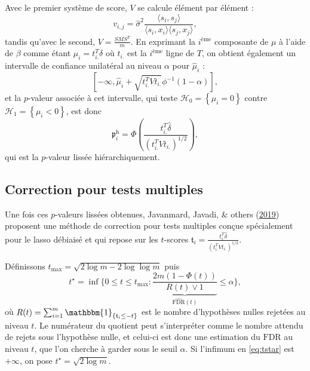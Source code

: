 \documentclass[12pt,a4paper]{reedthesis}
\newcommand \indic {\mathbbm{1}}
\newcommand \pv {\mathfrak{p}}
\newcommand \ts {\mathfrak{t}}
\newcommand \shifts {\delta}
\newcommand \optim {\beta}
\theoremstyle{definition}
\theoremstyle{definition}
\theoremstyle{definition}
\theoremstyle{remark}
\begin{document}
Avec le premier système de score, \(V\) se calcule élément par élément :
\begin{equation*}
v_{i,j} = \hat{\sigma}^2 \frac{\langle s_i,s_j\rangle}{\langle s_i,x_i\rangle\langle s_j,x_j\rangle},
\end{equation*}
tandis qu'avec le second, \(V = \frac{S M S^T }{m}\). En exprimant la \(i^{\text{ème}}\) composante de \(\mu\) à l'aide de \(\optim\) comme étant \(\mu_i = t_{i.}^T\shifts\) où \(t_{i.}\) est la \(i^{\text{ème}}\) ligne de \(T\), on obtient également un intervalle de confiance unilatéral au niveau \(\alpha\) pour \(\hat{\mu}_i\) :
\begin{equation*}
\left[-\infty, \hat{\mu}_i + \sqrt{t_{i.}^T V t_{i.}} \phi^{-1}\left(1-\alpha\right)\right],
\end{equation*}
et la \(p\)-valeur associée à cet intervalle, qui teste \(\mathcal{H}_0 = \left\{\mu_i = 0\right\}\) contre \(\mathcal{H}_1 = \left\{\mu_i < 0\right\}\), est donc
\begin{equation*}
\pv^\text{h}_i = \Phi\left(\frac{t_{i.}^T\hat{\shifts}}{\left(t_{i.}^TVt_{i.}\right)^{1/2}}\right),
\end{equation*}
qui est la \(p\)-valeur lissée hiérarchiquement.

\hypertarget{correction-pour-tests-multiples}{%
\subsection{Correction pour tests multiples}\label{correction-pour-tests-multiples}}

Une fois ces \(p\)-valeurs lissées obtenues, Javanmard, Javadi, \& others (\protect\hyperlink{ref-javanmard2019false}{2019}) proposent une méthode de correction pour tests multiples conçue spécialement pour le lasso débiaisé et qui repose sur les \(t\)-scores
\(\ts_i = \frac{t_{i.}^T\hat{\shifts}}{\left(t_{i.}^TVt_{i.}\right)^{1/2}}\).

Définissons \(t_{\text{max}} = \sqrt{2 \log m - 2 \log \log m}\) puis
\begin{equation}
\label{eq:tstar}
t^{\star} = \inf \bigg\{ 0 \leq t \leq t_{\max} : \underbrace{\frac{2 m(1 - \Phi(t))}{R(t) \vee 1}}_{\widehat{\text{FDR}}(t)} \leq \alpha \bigg\},
\end{equation}
où \(R(t)= \sum_{i = 1}^m \indic_{\{\ts_i \leq -t\}}\) est le nombre d'hypothèses nulles rejetées au niveau \(t\). Le numérateur du quotient peut s'interpréter comme le nombre attendu de rejets sous l'hypothèse nulle, et celui-ci est donc une estimation du \(\text{FDR}\) au niveau \(t\), que l'on cherche à garder sous le seuil \(\alpha\). Si l'infimum en \eqref{eq:tstar} est \(+\infty\), on pose \(t^{\star} = \sqrt{2 \log m}\).
\end{document}
